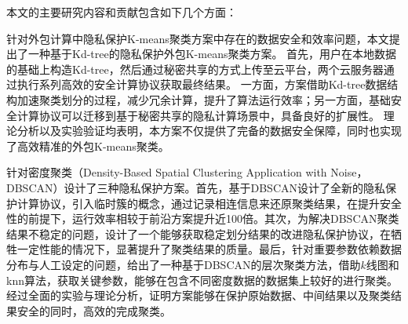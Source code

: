 \begin{cabstract}
本文的主要研究内容和贡献包含如下几个方面：
\begin{compactenum}
\item 针对外包计算中隐私保护K-means聚类方案中存在的数据安全和效率问题，本文提出了一种基于Kd-tree的隐私保护外包K-means聚类方案。
首先，用户在本地数据的基础上构造Kd-tree，然后通过秘密共享的方式上传至云平台，两个云服务器通过执行系列高效的安全计算协议获取最终结果。
一方面，方案借助Kd-tree数据结构加速聚类划分的过程，减少冗余计算，提升了算法运行效率；另一方面，基础安全计算协议可以迁移到基于秘密共享的隐私计算场景中，具备良好的扩展性。
理论分析以及实验验证均表明，本方案不仅提供了完备的数据安全保障，同时也实现了高效精准的外包K-means聚类。

\item 针对密度聚类（Density-Based Spatial Clustering Application with Noise，DBSCAN）设计了三种隐私保护方案。首先，基于DBSCAN设计了全新的隐私保护计算协议，引入临时簇的概念，通过记录相连信息来还原聚类结果，在提升安全性的前提下，运行效率相较于前沿方案提升近100倍。其次，为解决DBSCAN聚类结果不稳定的问题，设计了一个能够获取稳定划分结果的改进隐私保护协议，在牺牲一定性能的情况下，显著提升了聚类结果的质量。最后，针对重要参数依赖数据分布与人工设定的问题，给出了一种基于DBSCAN的层次聚类方法，借助$ k $线图和knn算法，获取关键参数，能够在包含不同密度数据的数据集上较好的进行聚类。经过全面的实验与理论分析，证明方案能够在保护原始数据、中间结果以及聚类结果安全的同时，高效的完成聚类。   
\end{compactenum}                                               
\end{cabstract}

